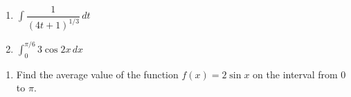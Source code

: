 \documentclass[11pt]{article}
\newcommand{\ds}{\displaystyle}
\begin{document}
\begin{multicols}{2}
\begin{enumerate}
\setcounter{enumi}{\theenumCount}
\item $\ds \int \dfrac{1}{(4t+1)^{1/3}} \, dt$
\item $\ds \int_0^{\pi/6} 3\cos 2x \, dx$
\setcounter{enumCount}{\theenumi}
\end{enumerate}
\end{multicols}
\vfill


\begin{enumerate}
\setcounter{enumi}{\theenumCount}
\item Find the average value of the function $f(x) = 2\sin x$ on the interval from $0$ to $\pi$. 
\vfill
\setcounter{enumCount}{\theenumi}
\end{enumerate}
\end{document}
